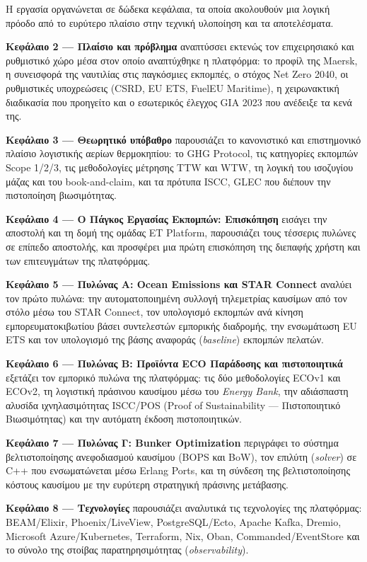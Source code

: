 \documentclass[11pt,a4paper,greek,twoside]{template-xe}
\begin{document}
Η εργασία οργανώνεται σε δώδεκα κεφάλαια, τα οποία ακολουθούν μια λογική
πρόοδο από το ευρύτερο πλαίσιο στην τεχνική υλοποίηση και τα
αποτελέσματα.

\textbf{Κεφάλαιο 2 --- Πλαίσιο και πρόβλημα} αναπτύσσει εκτενώς τον
επιχειρησιακό και ρυθμιστικό χώρο μέσα στον οποίο αναπτύχθηκε η
πλατφόρμα: το προφίλ της Maersk, η συνεισφορά της ναυτιλίας στις
παγκόσμιες εκπομπές, ο στόχος Net Zero 2040, οι ρυθμιστικές υποχρεώσεις
(CSRD, EU ETS, FuelEU Maritime), η χειρωνακτική διαδικασία που προηγείτο
και ο εσωτερικός έλεγχος GIA 2023 που ανέδειξε τα κενά της.

\textbf{Κεφάλαιο 3 --- Θεωρητικό υπόβαθρο} παρουσιάζει το κανονιστικό
και επιστημονικό πλαίσιο λογιστικής αερίων θερμοκηπίου: το GHG Protocol,
τις κατηγορίες εκπομπών Scope 1/2/3, τις μεθοδολογίες μέτρησης TTW και
WTW, τη λογική του ισοζυγίου μάζας και του book-and-claim, και τα
πρότυπα ISCC, GLEC που διέπουν την πιστοποίηση βιωσιμότητας.

\textbf{Κεφάλαιο 4 --- Ο Πάγκος Εργασίας Εκπομπών: Επισκόπηση} εισάγει
την αποστολή και τη δομή της ομάδας ET Platform, παρουσιάζει τους
τέσσερις πυλώνες σε επίπεδο αποστολής, και προσφέρει μια πρώτη
επισκόπηση της διεπαφής χρήστη και των επιτευγμάτων της πλατφόρμας.

\textbf{Κεφάλαιο 5 --- Πυλώνας Α: Ocean Emissions και STAR Connect}
αναλύει τον πρώτο πυλώνα: την αυτοματοποιημένη συλλογή τηλεμετρίας
καυσίμων από τον στόλο μέσω του STAR Connect, τον υπολογισμό εκπομπών
ανά κίνηση εμπορευματοκιβωτίου βάσει συντελεστών εμπορικής διαδρομής,
την ενσωμάτωση EU ETS και τον υπολογισμό της βάσης αναφοράς
(\emph{baseline}) εκπομπών πελατών.

\textbf{Κεφάλαιο 6 --- Πυλώνας Β: Προϊόντα ECO Παράδοσης και
πιστοποιητικά} εξετάζει τον εμπορικό πυλώνα της πλατφόρμας: τις δύο
μεθοδολογίες ECOv1 και ECOv2, τη λογιστική πράσινου καυσίμου μέσω του
\emph{Energy Bank}, την αδιάσπαστη αλυσίδα ιχνηλασιμότητας ISCC/POS
(Proof of Sustainability --- Πιστοποιητικό Βιωσιμότητας) και την
αυτόματη έκδοση πιστοποιητικών.

\textbf{Κεφάλαιο 7 --- Πυλώνας Γ: Bunker Optimization} περιγράφει το
σύστημα βελτιστοποίησης ανεφοδιασμού καυσίμου (BOPS και BoW), τον
επιλύτη (\emph{solver}) σε C++ που ενσωματώνεται μέσω Erlang Ports, και
τη σύνδεση της βελτιστοποίησης κόστους καυσίμου με την ευρύτερη
στρατηγική πράσινης μετάβασης.

\textbf{Κεφάλαιο 8 --- Τεχνολογίες} παρουσιάζει αναλυτικά τις
τεχνολογίες της πλατφόρμας: BEAM/Elixir, Phoenix/LiveView,
PostgreSQL/Ecto, Apache Kafka, Dremio, Microsoft Azure/Kubernetes,
Terraform, Nix, Oban, Commanded/EventStore και το σύνολο της στοίβας
παρατηρησιμότητας (\emph{observability}).
\end{document}
